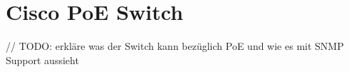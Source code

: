 \section{Cisco PoE Switch}
\label{sec:cisco}

// TODO: erkläre was der Switch kann bezüglich PoE und wie es mit SNMP Support aussieht